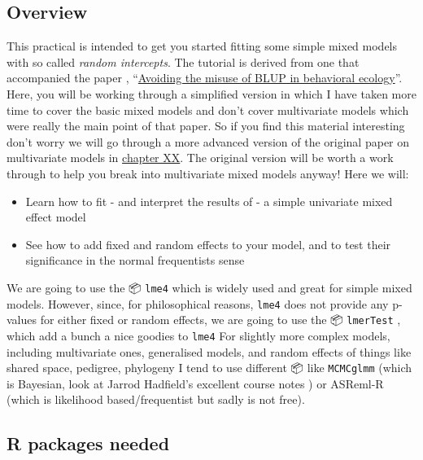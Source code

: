 \documentclass[
  12pt,
]{book}
\providecommand{\tightlist}{%
  \setlength{\itemsep}{0pt}\setlength{\parskip}{0pt}}
\begin{document}
\hypertarget{overview}{%
\subsection{Overview}\label{overview}}

This practical is intended to get you started fitting some simple mixed models with so called \emph{random intercepts}. The tutorial is derived from one that accompanied the paper \citep{houslay_avoiding_2017}, ``\href{https://doi.org/10.1093/beheco/arx023}{Avoiding the misuse of BLUP in behavioral ecology}''. Here, you will be working through a simplified version in which I have taken more time to cover the basic mixed models and don't cover multivariate models which were really the main point of that paper. So if you find this material interesting don't worry we will go through a more advanced version of the original paper on multivariate models in \protect\hyperlink{to_be_written}{chapter XX}. The original version will be worth a work through to help you break into multivariate mixed models anyway! Here we will:

\begin{itemize}
\tightlist
\item
  Learn how to fit - and interpret the results of - a simple univariate mixed effect model
\item
  See how to add fixed and random effects to your model, and to test their significance in the normal frequentists sense
\end{itemize}

We are going to use the 📦 \texttt{lme4} \citep{R-lme4} which is widely used and great for simple mixed models. However, since, for philosophical reasons, \texttt{lme4} does not provide any p-values for either fixed or random effects, we are going to use the 📦 \texttt{lmerTest} \citep{R-lmerTest}, which add a bunch a nice goodies to \texttt{lme4} For slightly more complex models, including multivariate ones, generalised models, and random effects of things like shared space, pedigree, phylogeny I tend to use different 📦 like \texttt{MCMCglmm} \citep{MCMCglmm2010} (which is Bayesian, look at Jarrod Hadfield's excellent course notes \citep{R-MCMCglmm}) or ASReml-R \citep{R-asreml} (which is likelihood based/frequentist but sadly is not free).

\hypertarget{r-packages-needed}{%
\subsection{R packages needed}\label{r-packages-needed}}
\end{document}
